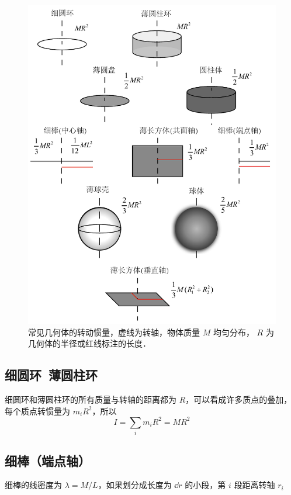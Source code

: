 

\begin{figure}[ht]
\centering
\includegraphics[width=12cm]{./figures/ExMI1.pdf}
\caption{常见几何体的转动惯量，虚线为转轴，物体质量 $M$ 均匀分布， $R$ 为几何体的半径或红线标注的长度．}\label{ExMI_fig1}
\end{figure}

\subsection{细圆环\ 薄圆柱环}
细圆环和薄圆柱环的所有质量与转轴的距离都为 $R$，可以看成许多质点的叠加，每个质点转惯量为 $m_i R^2$，所以
\begin{equation}
I = \sum_i m_i R^2 = M R^2
\end{equation}

\subsection{ 细棒（端点轴）}
细棒的线密度为 $\lambda  = M/L$，如果划分成长度为 $\dd{r}$ 的小段，第 $i$ 段距离转轴 $r_i$

